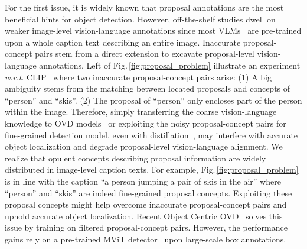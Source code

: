 \documentclass[10pt,twocolumn,letterpaper]{article}
\begin{document}
For the first issue, it is widely known that proposal annotations are the most beneficial hints for object detection. 
However, off-the-shelf studies dwell on weaker image-level vision-language annotations since most VLMs~\cite{clip,pixelbert,gao2022pyramidclip} are pre-trained upon a whole caption text describing an entire image.
Inaccurate proposal-concept pairs stem from a direct extension to excavate proposal-level vision-language annotations.
Left of Fig.\,\ref{fig:proposal_problem} illustrate an experiment \emph{w.r.t}. CLIP~\cite{clip} where two inaccurate proposal-concept pairs arise: (1) A big ambiguity stems from the matching between located proposals and concepts of ``person'' and ``skis''. (2) The proposal of ``person'' only encloses part of the person within the image. 
Therefore, simply transferring the coarse vision-language knowledge to OVD models~\cite{ovrcnn} or exploiting the noisy proposal-concept pairs for fine-grained detection model, even with distillation~\cite{vild}, may interfere with accurate object localization and degrade proposal-level vision-language alignment. 
We realize that opulent concepts describing proposal information are widely distributed in image-level caption texts. For example, Fig.\,\ref{fig:proposal_problem} is in line with the caption ``a person jumping a pair of skis in the air'' where ``person'' and ``skis'' are indeed fine-grained proposal concepts. 
Exploiting these proposal concepts might help overcome inaccurate proposal-concept pairs and uphold accurate object localization.
Recent Object Centric OVD~\cite{objcentric-ovd} solves this issue by training on filtered proposal-concept pairs. However, the performance gains rely on a pre-trained MViT detector~\cite{Maaz2022Multimodal} upon large-scale box annotations.
\end{document}
